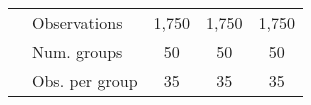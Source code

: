 \begin{tabular}{l|lccc}
& Observations & 1,750 & 1,750 & 1,750 \\ 

& Num. groups  & 50 & 50 & 50 \\ 

& Obs. per group  &35&35&35\\ 
\end{tabular} 
